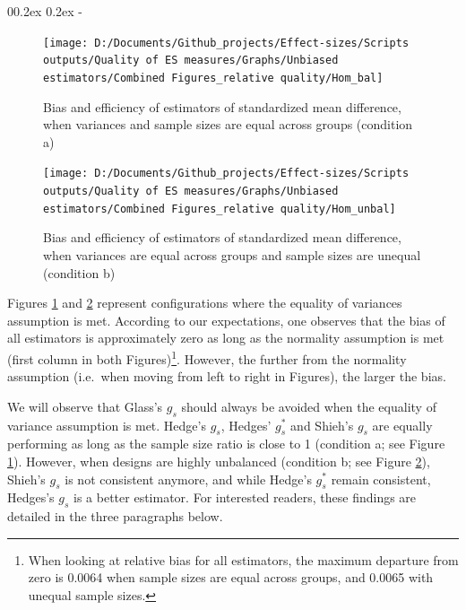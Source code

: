 \documentclass[
  english,
  man,floatsintext]{apa6}
\makeatletter
\let\oldsubparagraph\subparagraph
\renewcommand{\subparagraph}[1]{\oldsubparagraph{#1}\mbox{}}
\renewcommand{\subparagraph}[1]{\@startsection{subparagraph}{5}{1em}%
  {0\baselineskip \@plus 0.2ex \@minus 0.2ex}%
  {-\z@\relax}%
  {\normalfont\normalsize\itshape\hspace{\parindent}{#1}\textit{\addperi}}{\relax}}
\makeatother
\begin{document}
\hypertarget{when-variances-are-equal-across-groups}{%
\subparagraph{When variances are equal across groups}\label{when-variances-are-equal-across-groups}}

\begin{figure}

{\centering \texttt{[image: D:/Documents/Github\_projects/Effect-sizes/Scripts outputs/Quality of ES measures/Graphs/Unbiased estimators/Combined Figures\_relative quality/Hom\_bal]} 

}

\caption{Bias and efficiency of estimators of standardized mean difference, when variances and sample sizes are equal across groups (condition a)}\label{fig:idHombal}
\end{figure}

\begin{figure}

{\centering \texttt{[image: D:/Documents/Github\_projects/Effect-sizes/Scripts outputs/Quality of ES measures/Graphs/Unbiased estimators/Combined Figures\_relative quality/Hom\_unbal]} 

}

\caption{Bias and efficiency of estimators of standardized mean difference, when variances are equal across groups and sample sizes are unequal (condition b)}\label{fig:idHomunbal}
\end{figure}

Figures \ref{fig:idHombal} and \ref{fig:idHomunbal} represent configurations where the equality of variances assumption is met. According to our expectations, one observes that the bias of all estimators is approximately zero as long as the normality assumption is met (first column in both Figures)\footnote{When looking at relative bias for all estimators, the maximum departure from zero is 0.0064 when sample sizes are equal across groups, and 0.0065 with unequal sample sizes.}. However, the further from the normality assumption (i.e.~when moving from left to right in Figures), the larger the bias.

We will observe that Glass's \(g_s\) should always be avoided when the equality of variance assumption is met. Hedge's \(g_s\), Hedges' \(g ^ *_s\) and Shieh's \(g_s\) are equally performing as long as the sample size ratio is close to 1 (condition a; see Figure \ref{fig:idHombal}). However, when designs are highly unbalanced (condition b; see Figure \ref{fig:idHomunbal}), Shieh's \(g_s\) is not consistent anymore, and while Hedge's \(g^*_s\) remain consistent, Hedges's \(g_s\) is a better estimator. For interested readers, these findings are detailed in the three paragraphs below.
\end{document}

